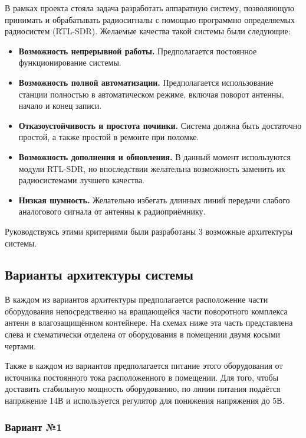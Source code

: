 \documentclass[a4paper, 14pt, titlepage, fleqn]{extarticle}
\begin{document}
	В рамках проекта стояла задача разработать аппаратную систему, позволяющую принимать и обрабатывать радиосигналы с помощью программно определяемых радиосистем (RTL-SDR). Желаемые качества такой системы были следующие:
	\begin{itemize}
		\item \textbf{Возможность непрерывной работы.} Предполагается постоянное функционирование системы.
		\item \textbf{Возможность полной автоматизации.} Предполагается использование станции полностью в автоматическом режиме, включая поворот антенны, начало и конец записи.
		\item \textbf{Отказоустойчивость и простота починки.} Система должна быть достаточно простой, а также простой в ремонте при поломке.
		\item \textbf{Возможность дополнения и обновления.} В данный момент используются модули RTL-SDR, но впоследствии желательна возможность заменить их радиосистемами лучшего качества.
		\item \textbf{Низкая шумность.} Желательно избегать длинных линий передачи слабого аналогового сигнала от антенны к радиоприёмнику.
	\end{itemize}
	
	Руководствуясь этими критериями были разработаны 3 возможные архитектуры системы.
	
	\subsection*{Варианты архитектуры системы}
	
	В каждом из вариантов архитектуры предполагается расположение части оборудования непосредственно на вращающейся части поворотного комплекса антенн в влагозащищённом контейнере. На схемах ниже эта часть представлена слева и схематически отделена от оборудования в помещении двумя косыми чертами.
	
	Также в каждом из вариантов предполагается питание этого оборудования от источника постоянного тока расположенного в помещении. Для того, чтобы доставить стабильную мощность оборудованию, по линии питания подаётся напряжение 14В и используется регулятор для понижения напряжения до 5В.
	
	\subsubsection*{Вариант №1}
	
\end{document}
